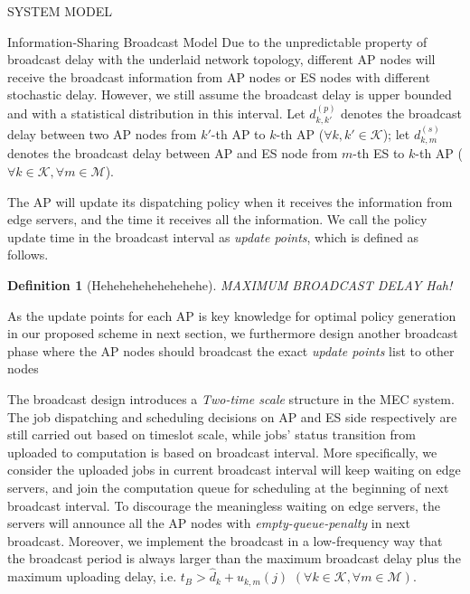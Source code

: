 \documentclass[10pt, conference, letterpaper]{IEEEtran}
\newtheorem{definition}{Definition}
\newcommand{\apSet}{\mathcal{K}}
\newcommand{\esSet}{\mathcal{M}}
\begin{document}
\begin{section}{SYSTEM MODEL}
\begin{subsection}{Information-Sharing Broadcast Model}
            {\color{red}Due to the unpredictable property of broadcast delay with the underlaid network topology, different AP nodes will receive the broadcast information from AP nodes or ES nodes with different stochastic delay. However, we still assume the broadcast delay is upper bounded and with a statistical distribution in this interval.}
            Let $d^{(p)}_{k,k'}$ denotes the broadcast delay between two AP nodes from $k'$-th AP to $k$-th AP ($\forall k,k'\in\apSet$); let $d^{(s)}_{k,m}$ denotes the broadcast delay between AP and ES node from $m$-th ES to $k$-th AP ($\forall k\in\apSet,\forall m\in\esSet$).
            
            The AP will update its dispatching policy when it receives the information from edge servers, and the time it receives all the information. We call the policy update time in the broadcast interval as \emph{update points}, which is defined as follows.
            \begin{definition}[Hehehehehehehehehe]
                MAXIMUM BROADCAST DELAY Hah!
            \end{definition}

            As the update points for each AP is key knowledge for optimal policy generation in our proposed scheme in next section, we furthermore design another broadcast phase where the AP nodes should broadcast the exact \emph{update points} list to other nodes

            The broadcast design introduces a \emph{Two-time scale} structure in the MEC system.
            The job dispatching and scheduling decisions on AP and ES side respectively are still carried out based on timeslot scale, while jobs' status transition from uploaded to computation is based on broadcast interval.
            More specifically, we consider the uploaded jobs in current broadcast interval will keep waiting on edge servers, and join the computation queue for scheduling at the beginning of next broadcast interval.
            {\color{red}To discourage the meaningless waiting on edge servers, the servers will announce all the AP nodes with \emph{empty-queue-penalty} in next broadcast. Moreover, we implement the broadcast in a low-frequency way that the broadcast period is always larger than the maximum broadcast delay plus the maximum uploading delay, i.e. $t_B > \hat{d}_{k} + u_{k,m}(j)$ $(\forall k\in\apSet, \forall m\in\esSet)$.}
        \end{subsection}
    \end{section}
\end{document}
